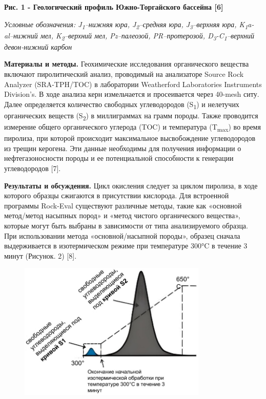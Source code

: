 {\bfseries Рис. 1 - Геологический профиль Южно-Торгайского бассейна
{[}6{]}}

\emph{Условные обозначения: J\textsubscript{1}--нижняя юра,
J\textsubscript{2}--средняя юра, J\textsubscript{3}--верхняя юра,
K\textsubscript{1}a-al--нижний мел, K\textsubscript{2}--верхний мел,
Pz--палеозой, PR--протерозой,
D\textsubscript{3}-C\textsubscript{1}--верхний девон-нижний карбон}

{\bfseries Материалы и методы.} Геохимические исследования органического
вещества включают пиролитический анализ, проводимый на анализаторе
Source Rock Analyzer (SRA-TPH/TOC) в лаборатории Weatherford
Laboratories Instruments Division's. В ходе анализа керн измельчается и
просеивается через 40-mesh ситу. Далее определяется количество свободных
углеводородов (S\textsubscript{1}) и нелетучих органических веществ
(S\textsubscript{2}) в миллиграммах на грамм породы. Также проводится
измерение общего органического углерода (TOC) и температура
(T\textsubscript{max}) во время пиролиза, при которой происходит
максимальное высвобождение углеводородов из трещин керогена. Эти данные
необходимы для получения информации о нефтегазоносности породы и ее
потенциальной способности к генерации углеводородов {[}7{]}.

{\bfseries Результаты и обсуждения.} Цикл окисления следует за циклом
пиролиза, в ходе которого образцы сжигаются в присутствии кислорода. Для
встроенной программы Rock-Eval существуют различные методы, такие как
«основной метод/метод насыпных пород» и «метод чистого органического
вещества», которые могут быть выбраны в зависимости от типа
анализируемого образца. При использовании метода «основной/насыпной
породы», образец сначала выдерживается в изотермическом режиме при
температуре 300°C в течение 3 минут (Рисунок. 2) {[}8{]}.

\begin{figure}[H]
	\centering
	\includegraphics[width=0.8\textwidth]{assets/1259}
	\caption*{}
\end{figure}

